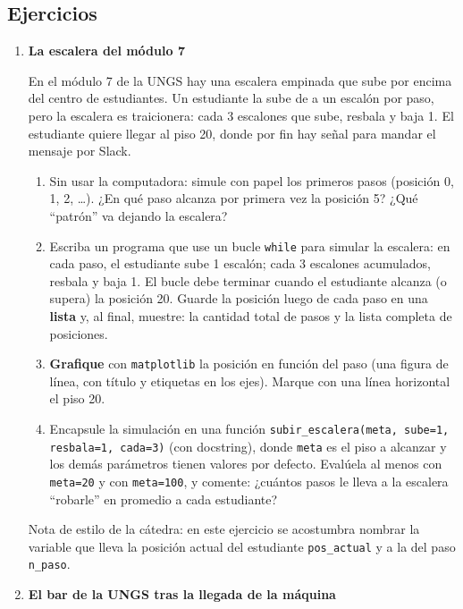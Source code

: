 \documentclass[a4paper,11pt]{article}
\begin{document}
\subsection*{Ejercicios}
\begin{enumerate}

\item \textbf{La escalera del módulo 7}

En el módulo 7 de la UNGS hay una escalera empinada que sube por encima del centro de estudiantes. Un estudiante la sube de a un escalón por paso, pero la escalera es traicionera: cada 3 escalones que sube, resbala y baja 1. El estudiante quiere llegar al piso 20, donde por fin hay señal para mandar el mensaje por Slack.

\begin{enumerate}
    \item Sin usar la computadora: simule con papel los primeros pasos (posición 0, 1, 2, \dots). ¿En qué paso alcanza por primera vez la posición 5? ¿Qué ``patrón'' va dejando la escalera?
    \item Escriba un programa que use un bucle \texttt{while} para simular la escalera: en cada paso, el estudiante sube 1 escalón; cada 3 escalones acumulados, resbala y baja 1. El bucle debe terminar cuando el estudiante alcanza (o supera) la posición 20. Guarde la posición luego de cada paso en una \textbf{lista} y, al final, muestre: la cantidad total de pasos y la lista completa de posiciones.
    \item \textbf{Grafique} con \texttt{matplotlib} la posición en función del paso (una figura de línea, con título y etiquetas en los ejes). Marque con una línea horizontal el piso 20.
    \item Encapsule la simulación en una función \texttt{subir\_escalera(meta, sube=1, resbala=1, cada=3)} (con docstring), donde \texttt{meta} es el piso a alcanzar y los demás parámetros tienen valores por defecto. Evalúela al menos con \texttt{meta=20} y con \texttt{meta=100}, y comente: ¿cuántos pasos le lleva a la escalera ``robarle'' en promedio a cada estudiante?
\end{enumerate}
{\color{white}Nota de estilo de la cátedra: en este ejercicio se acostumbra nombrar la variable que lleva la posición actual del estudiante \texttt{pos\_actual} y a la del paso \texttt{n\_paso}.}

\item \textbf{El bar de la UNGS tras la llegada de la máquina}


\end{enumerate}
\end{document}
